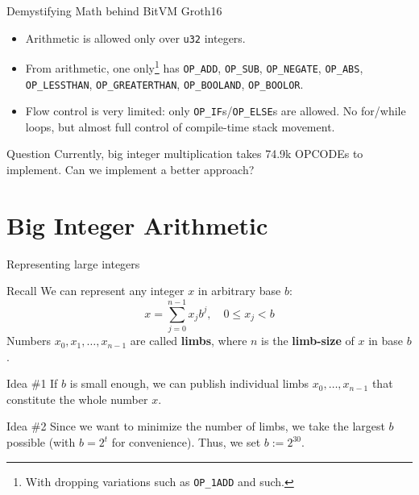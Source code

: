 \documentclass{zkdl-presentation-template}
\newcommand{\cmark}{\textcolor{green!65!black}{\ding{51}}}%
\begin{document}
    \begin{frame}{Demystifying Math behind BitVM Groth16}
        \begin{itemize}[label=\cmark]
            \item Arithmetic is allowed only over \texttt{u32} integers.\pause
            \item From arithmetic, one only\footnote{With dropping variations such as \texttt{OP\_1ADD} and such.} has \texttt{OP\_ADD}, \texttt{OP\_SUB}, \texttt{OP\_NEGATE}, \texttt{OP\_ABS}, \texttt{OP\_LESSTHAN}, \texttt{OP\_GREATERTHAN}, \texttt{OP\_BOOLAND}, \texttt{OP\_BOOLOR}.\pause
            \item Flow control is very limited: only \texttt{OP\_IF}s/\texttt{OP\_ELSE}s are allowed. No for/while loops, but almost full control of compile-time stack movement.\pause
        \end{itemize}

        \begin{alertblock}{Question}
            Currently, big integer multiplication takes 74.9k OPCODEs to implement. Can we implement a better approach?
        \end{alertblock}
    \end{frame}

    \section{Big Integer Arithmetic}

    \begin{frame}{Representing large integers}
        \begin{block}{Recall}
            We can represent any integer $x$ in arbitrary base $b$:
            \begin{equation*}
                x = \sum_{j=0}^{n-1} x_jb^j, \quad 0 \leq x_j < b
            \end{equation*}
            \pause Numbers $x_0,x_1,\dots,x_{n-1}$ are called \textbf{limbs}, where $n$ is the \textbf{limb-size} of $x$ in base $b$.\pause
        \end{block}

        \begin{alertblock}{Idea \#1}
            If $b$ is small enough, we can publish individual limbs $x_0,\dots,x_{n-1}$ that constitute the whole number $x$.\pause
        \end{alertblock}

        \begin{alertblock}{Idea \#2}
            Since we want to minimize the number of limbs, we take the largest $b$ possible (with $b=2^t$ for convenience). Thus, we set $b := 2^{30}$.
        \end{alertblock}
    \end{frame}
\end{document}
